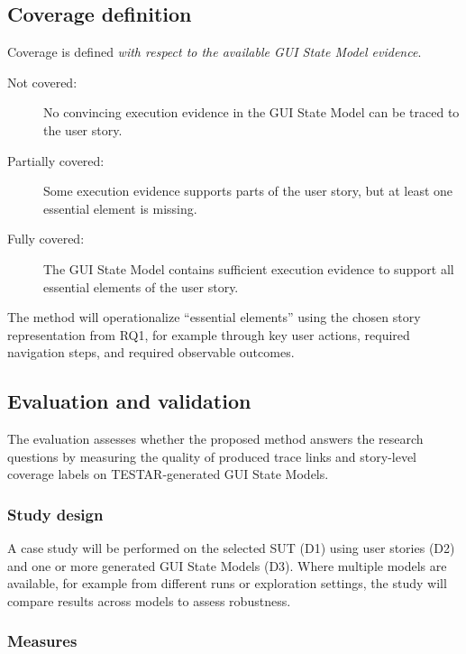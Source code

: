 \subsection{Coverage definition}
\label{subsec:coverage-definition}

Coverage is defined \emph{with respect to the available GUI State Model evidence}.

\begin{description}
    \item[Not covered:] No convincing execution evidence in the GUI State Model can be traced to the user story.
    \item[Partially covered:] Some execution evidence supports parts of the user story, but at least one essential element is missing.
    \item[Fully covered:] The GUI State Model contains sufficient execution evidence to support all essential elements of the user story.
\end{description}

The method will operationalize ``essential elements'' using the chosen story representation from RQ1, for example through key user actions, required navigation steps, and required observable outcomes.

\subsection{Evaluation and validation}
\label{subsec:evaluation-validation}

The evaluation assesses whether the proposed method answers the research questions by measuring the quality of produced trace links and story-level coverage labels on TESTAR-generated GUI State Models.

\subsubsection{Study design}

A case study will be performed on the selected SUT (D1) using user stories (D2) and one or more generated GUI State Models (D3). Where multiple models are available, for example from different runs or exploration settings, the study will compare results across models to assess robustness.

\subsubsection{Measures}

